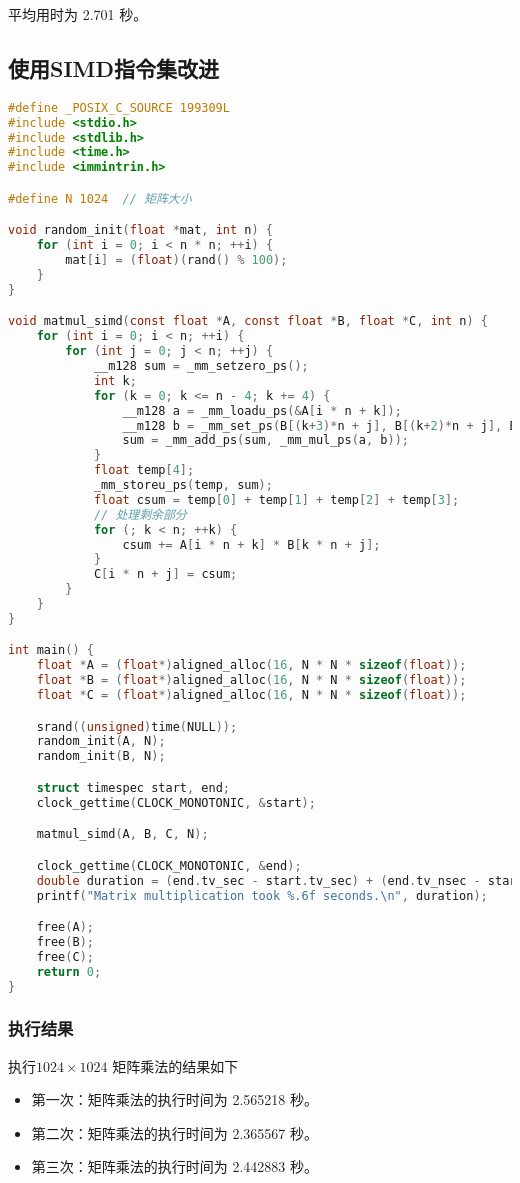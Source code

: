 \documentclass[a4paper,12pt]{ctexart}
\begin{document}
平均用时为 2.701 秒。

\subsection{使用SIMD指令集改进}
\begin{lstlisting}[language=C, caption={使用SIMD指令集C语言源码}]
#define _POSIX_C_SOURCE 199309L
#include <stdio.h>
#include <stdlib.h>
#include <time.h>
#include <immintrin.h>

#define N 1024  // 矩阵大小

void random_init(float *mat, int n) {
    for (int i = 0; i < n * n; ++i) {
        mat[i] = (float)(rand() % 100);
    }
}

void matmul_simd(const float *A, const float *B, float *C, int n) {
    for (int i = 0; i < n; ++i) {
        for (int j = 0; j < n; ++j) {
            __m128 sum = _mm_setzero_ps();
            int k;
            for (k = 0; k <= n - 4; k += 4) {
                __m128 a = _mm_loadu_ps(&A[i * n + k]);
                __m128 b = _mm_set_ps(B[(k+3)*n + j], B[(k+2)*n + j], B[(k+1)*n + j], B[k*n + j]);
                sum = _mm_add_ps(sum, _mm_mul_ps(a, b));
            }
            float temp[4];
            _mm_storeu_ps(temp, sum);
            float csum = temp[0] + temp[1] + temp[2] + temp[3];
            // 处理剩余部分
            for (; k < n; ++k) {
                csum += A[i * n + k] * B[k * n + j];
            }
            C[i * n + j] = csum;
        }
    }
}

int main() {
    float *A = (float*)aligned_alloc(16, N * N * sizeof(float));
    float *B = (float*)aligned_alloc(16, N * N * sizeof(float));
    float *C = (float*)aligned_alloc(16, N * N * sizeof(float));

    srand((unsigned)time(NULL));
    random_init(A, N);
    random_init(B, N);

    struct timespec start, end;
    clock_gettime(CLOCK_MONOTONIC, &start);

    matmul_simd(A, B, C, N);

    clock_gettime(CLOCK_MONOTONIC, &end);
    double duration = (end.tv_sec - start.tv_sec) + (end.tv_nsec - start.tv_nsec) / 1e9;
    printf("Matrix multiplication took %.6f seconds.\n", duration);

    free(A);
    free(B);
    free(C);
    return 0;
}
\end{lstlisting}

\subsubsection{执行结果}
执行$1024 \times 1024$ 矩阵乘法的结果如下
\begin{itemize}
    \item 第一次：矩阵乘法的执行时间为 2.565218 秒。
    \item 第二次：矩阵乘法的执行时间为 2.365567 秒。
    \item 第三次：矩阵乘法的执行时间为 2.442883 秒。
\end{itemize}
\end{document}
